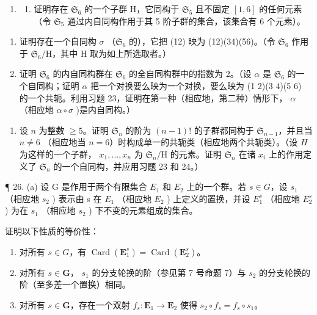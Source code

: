 \begin{enumerate}
\def\labelenumi{\arabic{enumi}。}
\setcounter{enumi}{23}
\tightlist
\item
  \begin{enumerate}
  \def\labelenumii{(\alph{enumii})}
  \tightlist
  \item
    证明存在 \(\mathfrak{S}_6\) 的一个子群 H，它同构于 \(\mathfrak{S}_5\) 且不固定 \([1,6]\) 的任何元素（令 \(\mathfrak{S}_5\) 通过内自同构作用于其 5 阶子群的集合，该集合有 6 个元素）。
  \end{enumerate}
\end{enumerate}

\begin{enumerate}
\def\labelenumi{(\alph{enumi})}
\setcounter{enumi}{1}
\item
  证明存在一个自同构 \(\sigma\) （\(\mathfrak{S}_{6}\) 的），它把 (12) 映为 (12)(34)(56)。（令 \(\mathfrak{S}_{6}\) 作用于 \(\mathfrak{S}_{6} / \mathrm{H}\)，其中 \(\mathrm{H}\) 取为如上所选取者。）
\item
  证明 \(\mathfrak{S}_{6}\) 的内自同构群在 \(\mathfrak{S}_{6}\) 的全自同构群中的指数为 2。（设 \(\alpha\) 是 \(\mathfrak{S}_{6}\) 的一个自同构；证明 \(\alpha\) 把一个对换要么映为一个对换，要么映为 (1 2)(3 4)(5 6) 的一个共轭。利用习题 23，证明在第一种（相应地，第二种）情形下， \(\alpha\) （相应地 \(\alpha \circ \sigma\) )是内自同构。）
\end{enumerate}

\begin{enumerate}
\def\labelenumi{\arabic{enumi}。}
\setcounter{enumi}{24}
\tightlist
\item
  设 \(n\) 为整数 \(\geqslant 5\)。证明 \(\mathfrak{S}_n\) 的阶为 \((n - 1)!\) 的子群都同构于 \(\mathfrak{S}_{n-1}\)，并且当 \(n \neq 6\) （相应地当 \(n = 6\)）时构成单一的共轭类（相应地两个共轭类）。（设 \(H\) 为这样的一个子群， \(x_1, \ldots, x_n\) 为 \(\mathfrak{S}_n / \mathrm{H}\) 的元素。证明 \(\mathfrak{S}_n\) 在诸 \(x_i\) 上的作用定义了 \(\mathfrak{S}_n\) 的一个自同构，并应用习题 23 和 24。）
\end{enumerate}

¶ 26. (a) 设 G 是作用于两个有限集合 \(E_{1}\) 和 \(E_{2}\) 上的一个群。若 \(s \in G\)，设 \(s_{1}\) （相应地 \(s_{2}\) ) 表示由 s 在 \(E_{1}\) （相应地 \(E_{2}\) ) 上定义的置换，并设 \(E_{1}^{s}\) （相应地 \(E_{2}^{s}\) ) 为在 \(s_{1}\) （相应地 \(s_{2}\) ) 下不变的元素组成的集合。

证明以下性质的等价性：

\begin{enumerate}
\def\labelenumi{(\roman{enumi})}
\item
  对所有 \(s \in G\)，有 \(\operatorname{Card}(\mathbf{E}_1^s) = \operatorname{Card}(\mathbf{E}_2^s)\)。
\item
  对所有 \(s \in \mathbf{G}\)， \(s_1\) 的分支轮换的阶（参见第 7 号命题 7）与 \(s_2\) 的分支轮换的阶（至多差一个置换）相同。
\item
  对所有 \(s \in \mathbf{G}\)，存在一个双射 \(f_s: \mathbf{E}_1 \to \mathbf{E}_2\) 使得 \(s_2 \circ f_s = f_s \circ s_1\)。
\end{enumerate}


